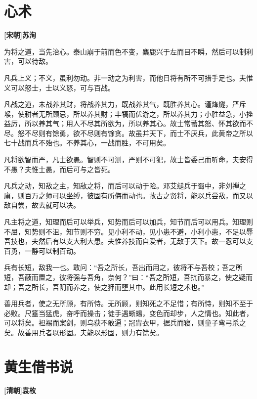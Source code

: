 \documentclass[UTF8,titlepage,oneside]{ctexbook}
\begin{document}
\chapter*{心术}
\begin{center}
	\textbf{[宋朝]苏洵}
\end{center}


为将之道，当先治心。泰山崩于前而色不变，麋鹿兴于左而目不瞬，然后可以制利害，可以待敌。


凡兵上义；不义，虽利勿动。非一动之为利害，而他日将有所不可措手足也。夫惟义可以怒士，士以义怒，可与百战。


凡战之道，未战养其财，将战养其力，既战养其气，既胜养其心。谨烽燧，严斥堠，使耕者无所顾忌，所以养其财；丰犒而优游之，所以养其力；小胜益急，小挫益厉，所以养其气；用人不尽其所欲为，所以养其心。故士常蓄其怒、怀其欲而不尽。怒不尽则有馀勇，欲不尽则有馀贪。故虽并天下，而士不厌兵，此黄帝之所以七十战而兵不殆也。不养其心，一战而胜，不可用矣。


凡将欲智而严，凡士欲愚。智则不可测，严则不可犯，故士皆委己而听命，夫安得不愚？夫惟士愚，而后可与之皆死。


凡兵之动，知敌之主，知敌之将，而后可以动于险。邓艾缒兵于蜀中，非刘禅之庸，则百万之师可以坐缚，彼固有所侮而动也。故古之贤将，能以兵尝敌，而又以敌自尝，故去就可以决。


凡主将之道，知理而后可以举兵，知势而后可以加兵，知节而后可以用兵。知理则不屈，知势则不沮，知节则不穷。见小利不动，见小患不避，小利小患，不足以辱吾技也，夫然后有以支大利大患。夫惟养技而自爱者，无敌于天下。故一忍可以支百勇，一静可以制百动。


兵有长短，敌我一也。敢问：“吾之所长，吾出而用之，彼将不与吾校；吾之所短，吾蔽而置之，彼将强与吾角，奈何？”曰：“吾之所短，吾抗而暴之，使之疑而却；吾之所长，吾阴而养之，使之狎而堕其中。此用长短之术也。”


善用兵者，使之无所顾，有所恃。无所顾，则知死之不足惜；有所恃，则知不至于必败。尺箠当猛虎，奋呼而操击；徒手遇蜥蜴，变色而却步，人之情也。知此者，可以将矣。袒裼而案剑，则乌获不敢逼；冠胄衣甲，据兵而寝，则童子弯弓杀之矣。故善用兵者以形固。夫能以形固，则力有馀矣。



\chapter*{黄生借书说}
\begin{center}
	\textbf{[清朝]袁枚}
\end{center}
\end{document}
